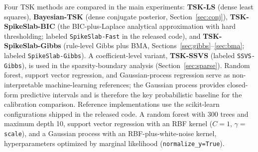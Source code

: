 \documentclass[review,1p,times]{elsarticle}
\begin{document}
Four TSK methods are compared in the main experiments: \textbf{TSK-LS} (dense least squares), \textbf{Bayesian-TSK} (dense conjugate posterior, Section~\ref{sec:conj}), \textbf{TSK-SpikeSlab-BIC} (the BIC-plus-Laplace analytical approximation with hard thresholding; labeled \texttt{SpikeSlab-Fast} in the released code), and \textbf{TSK-SpikeSlab-Gibbs} (rule-level Gibbs plus BMA, Sections~\ref{sec:gibbs}--\ref{sec:bma}; labeled \texttt{SpikeSlab-Gibbs}).
A coefficient-level variant, \textbf{TSK-SSVS} (labeled \texttt{SSVS-Gibbs}), is used in the sparsity-boundary analysis (Section~\ref{sec:sparse}). Random forest, support vector regression, and Gaussian-process regression serve as non-interpretable machine-learning references; the Gaussian process provides closed-form predictive intervals and is therefore the key probabilistic baseline for the calibration comparison.
Reference implementations use the scikit-learn configurations shipped in the released code.
A random forest with 300 trees and maximum depth 10, support vector regression with an RBF kernel ($C=1$, $\gamma=$ \texttt{scale}), and a Gaussian process with an RBF-plus-white-noise kernel, hyperparameters optimized by marginal likelihood (\texttt{normalize\_y=True}).
\end{document}
